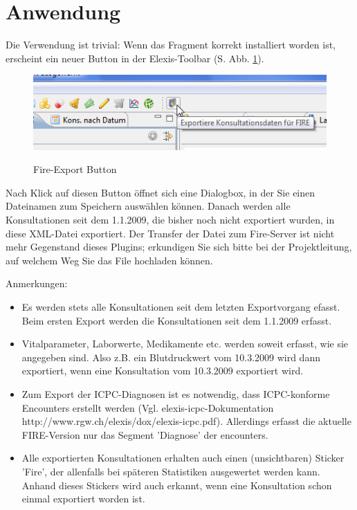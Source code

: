 \documentclass[a4paper]{scrartcl}
\begin{document}
\section{Anwendung}
Die Verwendung ist trivial: Wenn das Fragment korrekt installiert worden ist, erscheint ein neuer Button in der Elexis-Toolbar (S. Abb. \ref{fire:fig3}).
\begin{figure}
  \includegraphics{fire3}\\
  \caption{Fire-Export Button}\label{fire:fig3}
\end{figure}

Nach Klick auf diesen Button öffnet sich eine Dialogbox, in der Sie einen Dateinamen zum Speichern auswählen können. Danach werden alle Konsultationen seit dem 1.1.2009, die bisher noch nicht exportiert wurden, in diese XML-Datei exportiert. Der Transfer der Datei zum Fire-Server ist nicht mehr Gegenstand dieses Plugins; erkundigen Sie sich bitte bei der Projektleitung, auf welchem Weg Sie das File hochladen können.

\bigskip

Anmerkungen:
\begin{itemize}
\item Es werden stets alle Konsultationen seit dem letzten Exportvorgang efasst. Beim ersten Export werden die Konsultationen seit dem 1.1.2009 erfasst.
\item Vitalparameter, Laborwerte, Medikamente etc. werden soweit erfasst, wie sie angegeben sind. Also z.B. ein Blutdruckwert vom 10.3.2009 wird dann exportiert, wenn eine Konsultation vom 10.3.2009 exportiert wird.
\item Zum Export der ICPC-Diagnosen ist es notwendig, dass ICPC-konforme Encounters erstellt werden (Vgl. elexis-icpc-Dokumentation http://www.rgw.ch/elexis/dox/elexis-icpc.pdf). Allerdings erfasst die aktuelle FIRE-Version nur das Segment 'Diagnose' der encounters.
\item Alle exportierten Konsultationen erhalten auch einen (unsichtbaren) Sticker 'Fire', der allenfalls bei späteren Statistiken ausgewertet werden kann. Anhand dieses Stickers wird auch erkannt, wenn eine Konsultation schon einmal exportiert worden ist.
\end{itemize}
\end{document}
